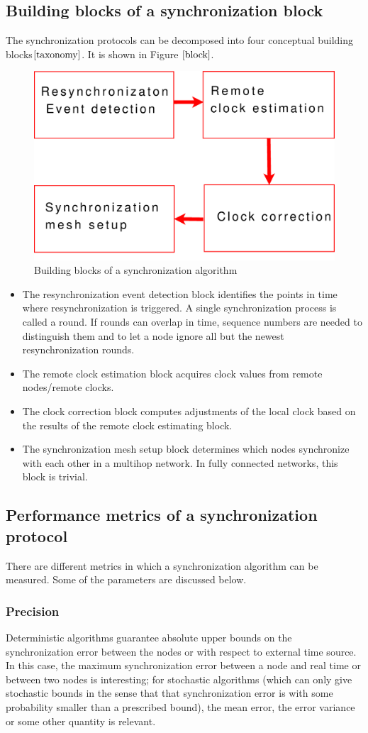 \documentclass[a4paper,10pt]{report}
\begin{document}
\subsection{\textbf{Building blocks of a synchronization block}}
The synchronization protocols can be decomposed into four conceptual building blocks$\cite{taxonomy}$. It is shown in Figure
$\ref{block}$.
\begin{figure}
 \centering
\includegraphics[width= 0.6 \textwidth]{buildingblock}
\caption{Building blocks of a synchronization algorithm}
\label{block}
\end{figure}
\begin{itemize}
\item The resynchronization event detection block identifies the points in time where resynchronization is triggered. A single synchronization process is called a round. If rounds can overlap in time, sequence numbers are needed to distinguish them and to let a node ignore all but the newest resynchronization rounds.
\item The remote clock estimation block acquires clock values from remote nodes/remote clocks.
\item The clock correction block computes adjustments of the local clock based on the results of the remote clock estimating block.
\item The synchronization mesh setup block determines which nodes synchronize with each other in a multihop network. In fully connected networks, this block is trivial.
\end{itemize}
\subsection{\textbf{Performance metrics of a synchronization protocol}}
There are different metrics in which a synchronization algorithm can be measured. Some of the parameters are discussed below.
\subsubsection{\textbf{Precision}}
Deterministic algorithms guarantee absolute upper bounds on the synchronization error between the nodes or with respect to external time source. In this case, the maximum synchronization error between a node and real time or between two nodes is interesting; for stochastic algorithms (which can only give stochastic bounds in the sense that that synchronization error is with some probability smaller than a prescribed bound), the mean error, the error variance or some other quantity is relevant.
\end{document}
